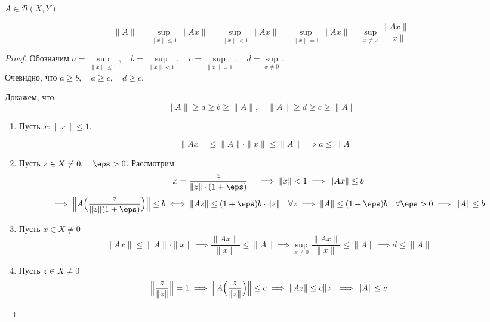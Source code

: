 \begin{theorem}
	$ A \in \mathscr B(X, Y) $

	$$ \|A\| = \sup\limits_{\|x\| \le 1}\|Ax\| =
	\sup\limits_{\|x\| < 1}\|Ax\| =
	\sup\limits_{\|x\| = 1}\|Ax\| =
	\sup\limits_{x \ne 0} \frac{\|Ax\|}{\|x\|} $$
\end{theorem}

\begin{proof}
	Обозначим $ a = \sup\limits_{\|x\| \le 1}, \quad b = \sup\limits_{\|x\| < 1}, \quad c = \sup\limits_{\|x\| = 1}, \quad
	d = \sup\limits_{x \ne 0} $. \\
	Очевидно, что $ a \ge b, \quad a \ge c, \quad d \ge c $.

	Докажем, что
	$$ \|A\| \ge a \ge b \ge \|A\|, \quad \|A\| \ge d \ge c \ge \|A\| $$

	\begin{enumerate}
		\item Пусть $ x : \|x\| \le 1 $.

			$$ \|Ax\| \le \|A\| \cdot \|x\| \le \|A\| \implies a \le \|A\| $$
		\item Пусть $ z \in X \ne 0, \quad \eps > 0 $.
			Рассмотрим
			$$ x = \frac z{\|z\| \cdot (1 + \eps)} \quad \implies \|x\| < 1 \implies \|Ax\| \le b $$
			$$ \implies \Bigl\| A \Bigl( \frac z{\|z\| (1 + \eps)} \Bigr) \Bigr\| \le b \iff
			\|Az\| \le (1 + \eps)b \cdot \|z\| \quad \forall z \implies
			\|A\| \le (1 + \eps)b \quad \forall \eps > 0 \implies
			\|A\| \le b $$
		\item Пусть $ x \in X \ne 0 $
			$$ \|Ax\| \le \|A\| \cdot \|x\| \implies \frac{\|Ax\|}{\|x\|} \le \|A\| \implies
			\sup\limits_{x \ne 0} \frac{\|Ax\|}{\|x\|} \le \|A\| \implies
			d \le \|A\| $$
		\item Пусть $ z \in X \ne 0 $
			$$ \Bigl\| \frac z{\|z\|} \Bigr\| = 1 \implies
			\Bigl\| A \Bigl( \frac z{\|z\|} \Bigr) \Bigr\| \le c \implies
			\|Az\| \le c\|z\| \implies
			\|A\| \le c $$
	\end{enumerate}
\end{proof}

